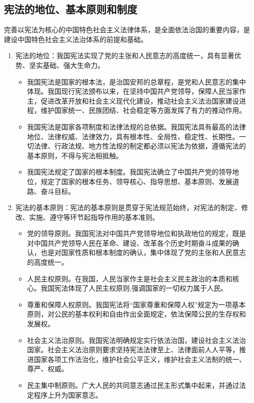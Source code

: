 \subsection{宪法的地位、基本原则和制度}
完善以宪法为核心的中国特色社会主义法律体系，是全面依法治国的重要内容，是建设中国特色社会主义法治体系的前提和基础。
\begin{enumerate}
\item 宪法的地位：我国宪法实现了党的主张和人民意志的高度统一，具有显著优势、坚实基础、强大生命力。
\begin{itemize}
\item 我国宪法是国家的根本法，是治国安邦的总章程，是党和人民意志的集中体现。我国现行宪法颁布以来，在坚持中国共产党领导，保障人民当家作主，促进改革开放和社会主义现代化建设，推动社会主义法治国家建设进程，维护国家统一、民族团结、社会稳定等方面发挥了有力的推动作用。
\item 我国宪法是国家各项制度和法律法规的总依据。我国宪法具有最高的法律地位、法律权威、法律效力，具有根本性、全局性、稳定性、长期性。一切法律、行政法规、地方性法规的制定都必须以宪法为依据，遵循宪法的基本原则，不得与宪法相抵触。
\item 我国宪法规定了国家的根本制度。我国宪法确立了中国共产党的领导地位，规定了国家的根本任务、领导核心、指导思想、基本原则、发展道路、奋斗目标。
\end{itemize}
\item 宪法的基本原则：宪法的基本原则是贯穿于宪法规范始终，对宪法的制定、修改、实施、遵守等环节起指导作用的基本准则。
\begin{itemize}
\item 党的领导原则。我国宪法对中国共产党领导地位和执政地位的规定，既是对中国共产党领导人民在革命、建设、改革各个历史时期奋斗成果的确认，也是对国家性质和根本制度的确认，集中体现了党的主张和人民意志的高度统一。
\item 人民主权原则。在我国，人民当家作主是社会主义民主政治的本质和核心。我国宪法体现了人民主权原则,强调国家的一切权力属于人民。
\item 尊重和保障人权原则。我国宪法将“国家尊重和保障人权”规定为一项基本原则，对公民的基本权利和自由作出全面规定，依法保障公民的生存权和发展权。
\item 社会主义法治原则。我国宪法明确规定实行依法治国，建设社会主义法治国家。社会主义法治原则要求坚持宪法法律至上、法律面前人人平等，推进国家各项工作法治化，维护社会公平正义，维护社会主义法制的统一、尊严、权威。
\item 民主集中制原则。广大人民的共同意志通过民主形式集中起来，并通过法定程序上升为国家意志。
\end{itemize}

\end{enumerate}
